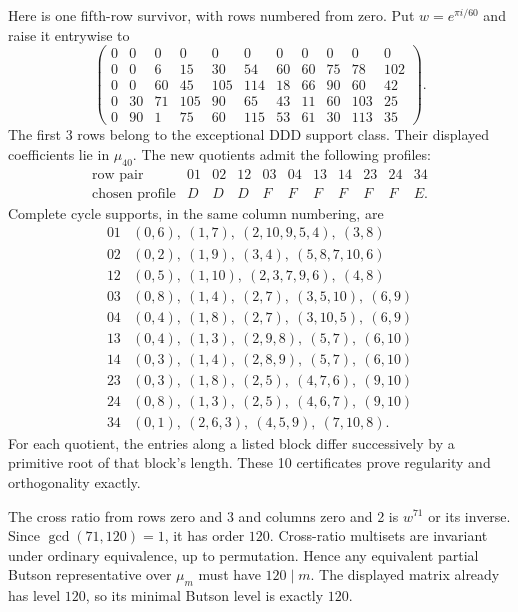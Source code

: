 \documentclass[11pt,a4paper]{article}
\theoremstyle{plain}
\theoremstyle{definition}
\theoremstyle{plain}
\begin{document}
Here is one fifth-row survivor, with rows numbered from zero. Put $w=e^{\pi i/60}$ and raise it entrywise to
\[
\begin{pmatrix}
0&0&0&0&0&0&0&0&0&0&0\\
0&0&6&15&30&54&60&60&75&78&102\\
0&0&60&45&105&114&18&66&90&60&42\\
0&30&71&105&90&65&43&11&60&103&25\\
0&90&1&75&60&115&53&61&30&113&35
\end{pmatrix}.
\]
The first 3 rows belong to the exceptional $\mathrm{DDD}$ support class. Their displayed coefficients lie in $\mu_{40}$. The new quotients admit the following profiles:
$$\begin{array}{c|cccccccccc}
\text{row pair}&01&02&12&03&04&13&14&23&24&34\\\hline
\text{chosen profile}&D&D&D&F&F&F&F&F&F&E.
\end{array}$$
Complete cycle supports, in the same column numbering, are
$$\begin{array}{c|l}
01&(0,6),\ (1,7),\ (2,10,9,5,4),\ (3,8)\\
02&(0,2),\ (1,9),\ (3,4),\ (5,8,7,10,6)\\
12&(0,5),\ (1,10),\ (2,3,7,9,6),\ (4,8)\\
03&(0,8),\ (1,4),\ (2,7),\ (3,5,10),\ (6,9)\\
04&(0,4),\ (1,8),\ (2,7),\ (3,10,5),\ (6,9)\\
13&(0,4),\ (1,3),\ (2,9,8),\ (5,7),\ (6,10)\\
14&(0,3),\ (1,4),\ (2,8,9),\ (5,7),\ (6,10)\\
23&(0,3),\ (1,8),\ (2,5),\ (4,7,6),\ (9,10)\\
24&(0,8),\ (1,3),\ (2,5),\ (4,6,7),\ (9,10)\\
34&(0,1),\ (2,6,3),\ (4,5,9),\ (7,10,8).
\end{array}$$
For each quotient, the entries along a listed block differ successively by a primitive root of that block's length. These 10 certificates prove regularity and orthogonality exactly.

The cross ratio from rows zero and 3 and columns zero and 2 is $w^{71}$ or its inverse. Since $\gcd(71,120)=1$, it has order $120$. Cross-ratio multisets are invariant under ordinary equivalence, up to permutation. Hence any equivalent partial Butson representative over $\mu_m$ must have $120\mid m$. The displayed matrix already has level $120$, so its minimal Butson level is exactly $120$.
\end{document}
